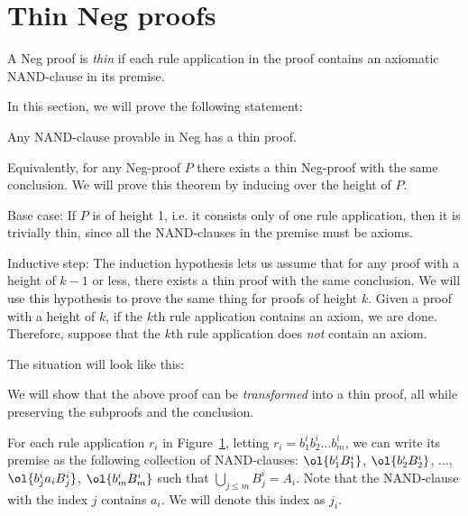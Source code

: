 \section{Thin Neg proofs}
\label{sec:Thin Neg proofs}
\begin{definition}
  A Neg proof is \textit{thin} if each rule application in the proof contains an axiomatic NAND-clause in its premise.
\end{definition}
In this section, we will prove the following statement:
\begin{theorem}
  Any NAND-clause provable in Neg has a thin proof.
\end{theorem}
Equivalently, for any Neg-proof $P$ there exists a thin Neg-proof with the same conclusion.
We will prove this theorem by inducing over the height of $P$.

Base case: If $P$ is of height 1, i.e. it consists only of one rule application, then it is trivially thin, since all the NAND-clauses in the premise must be axioms.

Inductive step: The induction hypothesis lets us assume that for any proof with a height of $k-1$ or less, there exists a thin proof with the same conclusion.
We will use this hypothesis to prove the same thing for proofs of height $k$.
Given a proof with a height of $k$, if the $k$th rule application contains an axiom, we are done.
Therefore, suppose that the $k$th rule application does \textit{not} contain an axiom.

The situation will look like this:\par
\begin{figure}[!h]
  \centering
  \begin{prooftree*}
    \Hypo{\dots}
    \Hypo{\dots}
    \Hypo{\dots}
    \Hypo{\dots}
    \Hypo{\dots}
  \end{prooftree*}
  \caption{}
  \label{fig:non_thin_proof}
\end{figure}
We will show that the above proof can be \textit{transformed} into a thin proof, all while preserving the subproofs and the conclusion.

For each rule application $r_i$ in Figure~\ref{fig:non_thin_proof}, letting $r_i = b^i_1b^i_2\dots b^i_m$, we can write its premise as the following collection of NAND-clauses:
$\ol{b^i_1B^i_1}$, $ \ol{b^i_2B^i_2}$, $\dots$, $ \ol{b^i_j a_i B^i_j}$, $\ol{b^i_mB^i_m}$ such that $\bigcup_{j \leq m} B^i_j = A_i$.
Note that the NAND-clause with the index $j$ contains $a_i$.
We will denote this index as $j_i$.

